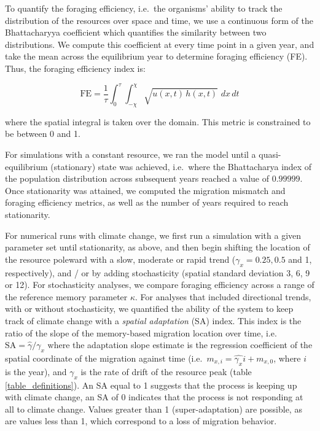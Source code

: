 \documentclass[utf8]{frontiersSCNS} %
\begin{document}
	To quantify the foraging efficiency, i.e.~the organisms' ability to track the distribution of the resources over space and time, we use a continuous form of the Bhattacharyya coefficient \citep{Bhattacharyya1943} which quantifies the similarity between two distributions. We compute this coefficient at every time point in a given year, and take the mean across the equilibrium year to determine foraging efficiency (FE). Thus, the foraging efficiency index is:
	
	$$\text{FE} = \frac{1}{\tau} \int_{0}^\tau \int_{-\chi}^{\chi} \sqrt{u(x,t) \, h(x,t)} \,\, dx\,dt$$
	
	\noindent where the spatial integral is taken over the domain. This metric is constrained to be between 0 and 1.
	
	For simulations with a constant resource, we ran the model until a quasi-equilibrium (stationary) state was achieved, i.e.~where the Bhattacharya index of the population distribution across subsequent years reached a value of $0.99999$. Once stationarity was attained, we computed the migration mismatch and foraging efficiency metrics, as well as the number of years required to reach stationarity.
	
	For numerical runs with climate change, we first run a simulation with a given parameter set until stationarity, as above, and then begin shifting the location of the resource poleward with a slow, moderate or rapid trend ($\gamma_x = 0.25, 0.5$ and 1, respectively), and / or by adding stochasticity (spatial standard deviation 3, 6, 9 or 12). For stochasticity analyses, we compare foraging efficiency across a range of the reference memory parameter $\kappa$.  For analyses that included directional trends, with or without stochasticity, we quantified the ability of the system to keep track of climate change with a \emph{spatial adaptation} (SA) index. This index is the ratio of the slope of the memory-based migration location over time, i.e.~$\text{SA} = \widehat{\gamma}/\gamma_x$  where the adaptation slope estimate is the regression coefficient of the spatial coordinate of the migration against time (i.e.~$m_{x,i} = \widehat{\gamma_x} i + m_{x,0}$, where $i$ is the year), and $\gamma_x$ is the rate of drift of the resource peak (table \ref{table_definitions}). An SA equal to 1 suggests that the process is keeping up with climate change, an SA of 0 indicates that the process is not responding at all to climate change.  Values greater than 1 (super-adaptation) are possible, as are values less than 1, which correspond to a loss of migration behavior.
	
\end{document}
